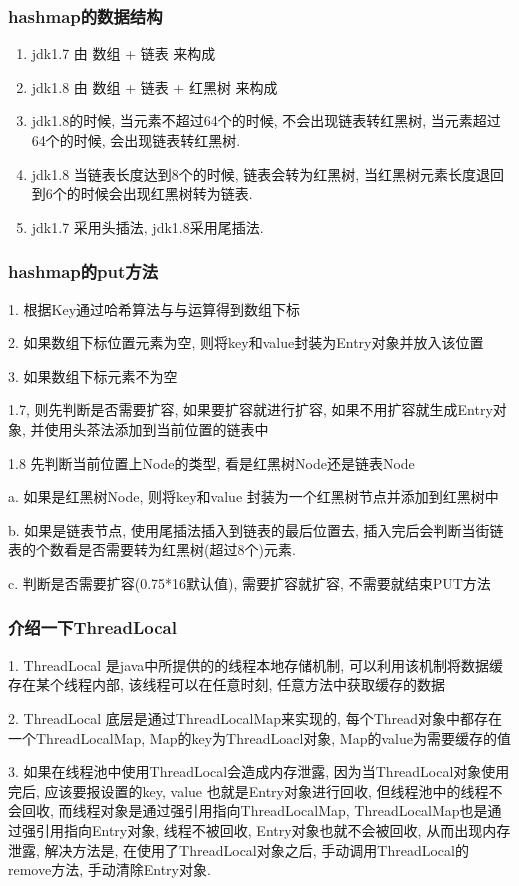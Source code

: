 \documentclass[UTF8]{ctexart}
\begin{document}
\subsubsection{hashmap的数据结构}
\begin{enumerate}
	\item jdk1.7 由 数组 + 链表  来构成
	\item jdk1.8 由 数组 + 链表 + 红黑树 来构成
	\item jdk1.8的时候, 当元素不超过64个的时候, 不会出现链表转红黑树, 当元素超过64个的时候, 会出现链表转红黑树.
	\item jdk1.8 当链表长度达到8个的时候, 链表会转为红黑树, 当红黑树元素长度退回到6个的时候会出现红黑树转为链表.
	\item jdk1.7 采用头插法, jdk1.8采用尾插法.
\end{enumerate}
\subsubsection{hashmap的put方法}
1. 根据Key通过哈希算法与与运算得到数组下标 \par
2. 如果数组下标位置元素为空, 则将key和value封装为Entry对象并放入该位置 \par
3. 如果数组下标元素不为空 \par
1.7, 则先判断是否需要扩容, 如果要扩容就进行扩容, 如果不用扩容就生成Entry对象, 并使用头茶法添加到当前位置的链表中 \par
1.8 先判断当前位置上Node的类型, 看是红黑树Node还是链表Node \par
a. 如果是红黑树Node, 则将key和value 封装为一个红黑树节点并添加到红黑树中 \par
b. 如果是链表节点, 使用尾插法插入到链表的最后位置去, 插入完后会判断当街链表的个数看是否需要转为红黑树(超过8个)元素. \par
c. 判断是否需要扩容(0.75*16默认值), 需要扩容就扩容, 不需要就结束PUT方法 \par
\subsubsection{介绍一下ThreadLocal} 
1. ThreadLocal 是java中所提供的的线程本地存储机制, 可以利用该机制将数据缓存在某个线程内部, 该线程可以在任意时刻, 任意方法中获取缓存的数据 \par
2. ThreadLocal 底层是通过ThreadLocalMap来实现的, 每个Thread对象中都存在一个ThreadLocalMap, Map的key为ThreadLoacl对象, Map的value为需要缓存的值 \par
3. 如果在线程池中使用ThreadLocal会造成内存泄露, 因为当ThreadLocal对象使用完后, 应该要报设置的key, value 也就是Entry对象进行回收, 但线程池中的线程不会回收, 而线程对象是通过强引用指向ThreadLocalMap, ThreadLocalMap也是通过强引用指向Entry对象, 线程不被回收, Entry对象也就不会被回收, 从而出现内存泄露, 解决方法是, 在使用了ThreadLocal对象之后, 手动调用ThreadLocal的remove方法, 手动清除Entry对象. \par
\end{document}
